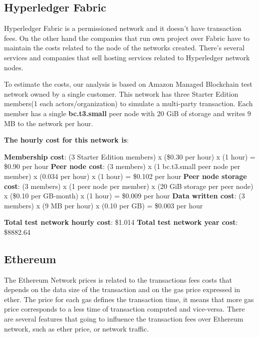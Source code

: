 \subsection{Hyperledger Fabric}

Hyperledger Fabric is a permissioned network and it doesn't have transaction fees. On the other hand the
companies that run own project over Fabric have to maintain the costs related to the node of the networks
created. There's several services and companies that sell hosting services related to Hyperledger network
nodes. 
\bigskip

To estimate the costs, our analysis is based on Amazon Managed Blockchain\cite{aws} test network owned by a single 
customer. This network has three Starter Edition members(1 each actors/organization) to simulate a multi-party transaction. 
Each member has a single \textbf{bc.t3.small} peer node with 20 GiB of storage and writes 9 MB to the network 
per hour.

\begin{outline}
    \1 \textbf{The hourly cost for this network is}:

    \2 \textbf{Membership cost}: (3 Starter Edition members) x (\$0.30 per hour) x (1 hour) = \$0.90 per hour
    \2 \textbf{Peer node cost}: (3 members) x (1 bc.t3.small peer node per member) x (0.034 per hour) x (1 hour) = \$0.102 per hour
    \2 \textbf{Peer node storage cost}: (3 members) x (1 peer node per member) x (20 GiB storage per peer node) x (\$0.10 per GB-month) x (1 hour) = \$0.009 per hour
    \2 \textbf{Data written cost}: (3 members) x (9 MB per hour) x (0.10 per GB) = \$0.003 per hour

    \1 \textbf{Total test network hourly cost}: \$1.014
    \1 \textbf{Total test network year cost}: \$8882.64
\end{outline}


\subsection{Ethereum}

The Ethereum Network prices is related to the transactions fees costs that depends on the data size 
of the transaction and on the gas price expressed in ether. The price for each gas defines
the transaction time, it means that more gas price corresponds to a less time of transaction computed 
and vice-versa. There are several features that going to influence the transaction fees over Ethereum 
network, such as ether price, or network traffic. 

